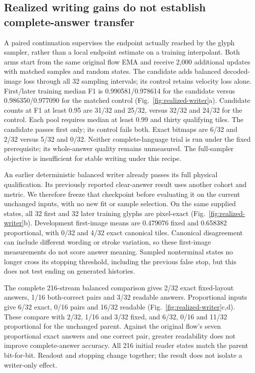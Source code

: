 \documentclass[12pt,a4paper]{article}
\providecommand{\DIFadd}[1]{{\protect\color{blue} \sf #1}} %
\begin{document}
\subsection*{\DIFadd{Realized writing gains do not establish complete-answer transfer}}
\DIFadd{A paired continuation supervises the endpoint actually reached by the glyph
sampler, rather than a local endpoint estimate on a training interpolant.
Both arms start from the same original flow EMA and receive 2,000 additional
updates with matched samples and random states. The candidate adds balanced
decoded-image loss through all 32 sampling intervals; its control retains
velocity loss alone. First/later training median F1 is 0.990581/0.978614 for
the candidate versus 0.986350/0.977090 for the matched control
(Fig.~\ref{fig:realized-writer}a). Candidate counts at F1 at least 0.95 are
31/32 and 25/32, versus 32/32 and 24/32 for the control. Each pool requires
median at least 0.99 and thirty qualifying tiles. The candidate passes first
only; its control fails both. Exact bitmaps are 6/32 and 2/32 versus 5/32 and
0/32. Neither complete-language trial is run under the fixed prerequisite;
its whole-answer quality remains unmeasured. The full-sampler objective is
insufficient for stable writing under this recipe.
}

\DIFadd{An earlier deterministic balanced writer already passes its full physical
qualification. Its previously reported clear-answer result uses another
cohort and metric. We therefore freeze that checkpoint before evaluating it
on the current unchanged inputs, with no new fit or sample selection. On the
same supplied states, all 32 first and 32 later training glyphs are pixel-exact
(Fig.~\ref{fig:realized-writer}b). Development first-image means are 0.479076
fixed and 0.658382 proportional, with 0/32 and 4/32 exact canonical tiles.
Canonical disagreement can include different wording or stroke variation,
so these first-image measurements do not score answer meaning. Sampled
nonterminal states no longer cross its stopping threshold, including the
previous false stop, but this does not test ending on generated histories.
}

\DIFadd{The complete 216-stream balanced comparison gives 2/32 exact fixed-layout
answers, 1/16 both-correct pairs and 3/32 readable answers. Proportional
inputs give 6/32 exact, 0/16 pairs and 16/32 readable
(Fig.~\ref{fig:realized-writer}c,d). These compare with 2/32, 1/16 and 3/32
fixed, and 6/32, 0/16 and 11/32 proportional for the unchanged parent.
Against the original flow's seven proportional exact answers and one correct
pair, greater readability does not improve complete-answer accuracy. All
216 initial reader states match the parent bit-for-bit. Readout and stopping
change together; the result does not isolate a writer-only effect.
}
\end{document}
